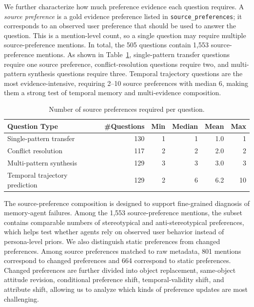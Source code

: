 \documentclass{llmxive}
\begin{document}
We further characterize how much preference evidence each question requires. A \emph{source preference} is a gold evidence preference listed in \texttt{source\_preferences}; it corresponds to an observed user preference that should be used to answer the question. This is a mention-level count, so a single question may require multiple source-preference mentions. In total, the 505 questions contain 1,553 source-preference mentions. As shown in Table~\ref{tab:personamem_evo_source_count}, single-pattern transfer questions require one source preference, conflict-resolution questions require two, and multi-pattern synthesis questions require three. Temporal trajectory questions are the most evidence-intensive, requiring 2--10 source preferences with median 6, making them a strong test of temporal memory and multi-evidence composition.

\begin{table}[!htbp]
\centering
\small
\begin{tabular}{lrrrrr}
\toprule
\textbf{Question Type} & \textbf{\#Questions} & \textbf{Min} & \textbf{Median} & \textbf{Mean} & \textbf{Max} \\
\midrule
Single-pattern transfer & 130 & 1 & 1 & 1.0 & 1 \\
Conflict resolution & 117 & 2 & 2 & 2.0 & 2 \\
Multi-pattern synthesis & 129 & 3 & 3 & 3.0 & 3 \\
Temporal trajectory prediction & 129 & 2 & 6 & 6.2 & 10 \\
\bottomrule
\end{tabular}
\caption{Number of source preferences required per question.}
\label{tab:personamem_evo_source_count}
\end{table}

The source-preference composition is designed to support fine-grained diagnosis of memory-agent failures. Among the 1,553 source-preference mentions, the subset contains comparable numbers of stereotypical and anti-stereotypical preferences, which helps test whether agents rely on observed user behavior instead of persona-level priors. We also distinguish static preferences from changed preferences. Among source preferences matched to raw metadata, 801 mentions correspond to changed preferences and 664 correspond to static preferences. Changed preferences are further divided into object replacement, same-object attitude revision, conditional preference shift, temporal-validity shift, and attribute shift, allowing us to analyze which kinds of preference updates are most challenging.
\end{document}

